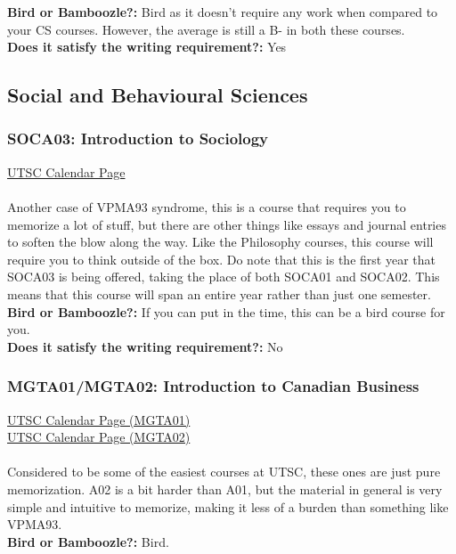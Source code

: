 \documentclass[11pt]{article}
\begin{document}
\textbf{Bird or Bamboozle?:} Bird as it doesn't require any work when
compared to your CS courses. However, the average is still a B- in both
these courses.\\

\textbf{Does it satisfy the writing requirement?:} Yes

\subsection{Social and Behavioural Sciences}
\subsubsection{SOCA03: Introduction to Sociology}
\href{https://utsc.calendar.utoronto.ca/course/soca03y3}{UTSC Calendar Page}\\\\
Another case of VPMA93 syndrome, this is a course that requires you to
memorize a lot of stuff, but there are other things like essays and
journal entries to soften the blow along the way. Like the Philosophy
courses, this course will require you to think outside of the box. Do
note that this is the first year that SOCA03 is being offered, taking
the place of both SOCA01 and SOCA02. This means that this course will
span an entire year rather than just one semester.\\

\textbf{Bird or Bamboozle?:}  If you can put in the time, this can be a bird course for you.\\

\textbf{Does it satisfy the writing requirement?:} No

\subsubsection{MGTA01/MGTA02: Introduction to Canadian Business}
\href{https://utsc.calendar.utoronto.ca/course/MGTA01H3}{UTSC Calendar Page (MGTA01)}\\
\href{https://utsc.calendar.utoronto.ca/course/MGTA02H3}{UTSC Calendar Page (MGTA02)}\\\\
Considered to be some of the easiest courses at UTSC, these ones are
just pure memorization. A02 is a bit harder than A01, but the material
in general is very simple and intuitive to memorize, making it less of a
burden than something like VPMA93.\\

\textbf{Bird or Bamboozle?:} Bird.\\
\end{document}
